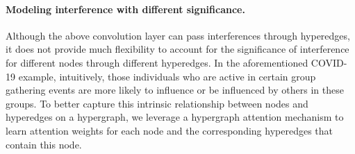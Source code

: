 \paragraph{Modeling interference with different significance.}
Although the above convolution layer can pass interferences through hyperedges, it does not provide much flexibility to account for the significance of interference for different nodes through different hyperedges. 
In the aforementioned COVID-19 example, intuitively, those individuals who are active in certain group gathering events are more likely to influence or be influenced by others in these groups. To better capture this intrinsic relationship between nodes and hyperedges on a hypergraph, 
we leverage a hypergraph attention mechanism \cite{bai2021hypergraph,zhang2019hyper,ding2020more} to learn attention weights for each node and the corresponding hyperedges that contain this node. 

